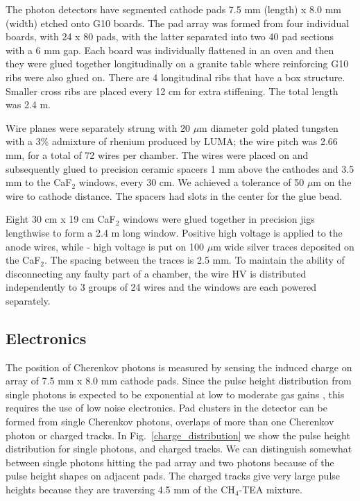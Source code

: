 \documentclass[fleqn,twoside]{article}
\begin{document}
The photon detectors have segmented cathode pads 7.5 mm (length) x 8.0 mm (width) etched onto G10 boards. The pad array was formed from four individual boards, with 24 x 80 pads, with the latter separated into two 40 pad sections with a 6 mm gap. Each board was individually flattened in an oven and then they were glued together longitudinally on a granite table where reinforcing G10 ribs were also glued on. There are 4 longitudinal ribs that have a box structure. Smaller cross ribs are placed every 12 cm for extra stiffening. The total length was 2.4 m.

Wire planes were separately strung with 20 $\mu$m diameter gold
plated tungsten with a 3\% admixture of rhenium produced by LUMA; the wire pitch
was 2.66 mm, for a total of 72 wires per chamber. The wires were
placed on and subsequently glued to precision ceramic spacers 1 mm
above the cathodes and 3.5 mm to the CaF$_2$ windows, every 30 cm.
We achieved a tolerance of 50 $\mu$m on the wire to cathode
distance. The spacers had slots in the center for the glue bead.

Eight 30 cm x 19 cm CaF$_2$ windows were glued together in precision jigs lengthwise to form a 2.4 m long window.
Positive high voltage is applied to the anode wires, while - high voltage is put on 100 $\mu$m wide silver traces deposited on the CaF$_2$. The spacing between the traces is 2.5 mm. To maintain the ability of disconnecting any faulty part of a chamber, the wire HV is distributed independently to 3 groups of 24 wires and the windows are each powered separately.

\subsection{Electronics}



The position of Cherenkov photons is measured by sensing the
induced charge on array of 7.5 mm x 8.0 mm cathode pads. Since the
pulse height distribution from single photons is expected to be
exponential at low to moderate gas gains \cite{expon}, this requires the use of low noise
electronics. Pad clusters in the detector can be formed from
single Cherenkov photons, overlaps of more than one Cherenkov
photon or charged tracks. In Fig.~\ref{charge_distribution} we
show the pulse height distribution for single photons, and charged
tracks. We can distinguish somewhat between single photons hitting
the pad array and two photons because of the pulse height shapes
on adjacent pads.
  The charged tracks give very large pulse heights because they are traversing
4.5 mm of the CH$_4$-TEA mixture. 
\end{document}

